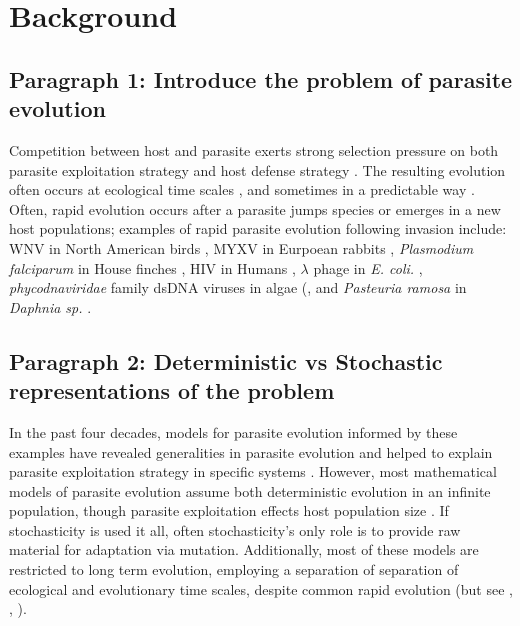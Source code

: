 
\section*{Background}

\subsection*{Paragraph 1: Introduce the problem of parasite evolution}

Competition between host and parasite exerts strong selection pressure on both parasite exploitation strategy and host defense strategy \citep{SchneiderandAyres2008, AyresandSchneider2012, KutzerandArmitage2016}. The resulting evolution often occurs at ecological time scales \citep{DayandProulx2004, Bolkeretal.2010, Lion2018}, and sometimes in a predictable way \citep{Ebert1998, Pugliese2002, Laineetal.2008, Frickeletal.2016}. Often, rapid evolution occurs after a parasite jumps species or emerges in a new host populations; examples of rapid parasite evolution following invasion include: WNV in North American birds \cite{Beasleyetal.2003}, MYXV in Eurpoean rabbits \citep{FennerandMarshall1957}, \emph{Plasmodium falciparum} in House finches \cite{Flemingetal.2018}, HIV in Humans \cite{Fraseretal.2007}, $\lambda$ phage in \emph{E. coli.} \cite{Berngruberetal.2015}, \emph{phycodnaviridae} family dsDNA viruses in algae (\citep{Frickeletal.2016, Frickeletal.2018}, and \emph{Pasteuria ramosa} in \emph{Daphnia sp.} \citep{Duffyetal.2009}. 

\subsection*{Paragraph 2: Deterministic vs Stochastic representations of the problem}

In the past four decades, models for parasite evolution informed by these examples have revealed generalities in parasite evolution and helped to explain parasite exploitation strategy in specific systems \citep[for a review see][]{Cressleretal.2016}. However, most mathematical models of parasite evolution assume both deterministic evolution in an infinite population, though parasite exploitation effects host population size \citep{Frickeletal.2016, Papkouetal.2016, Frickeletal.2018}. If stochasticity is used it all, often stochasticity's only role is to provide raw material for adaptation via mutation. Additionally, most of these models are restricted to long term evolution, employing a separation of separation of ecological and evolutionary time scales, despite common rapid evolution (but see \citealt{Bolkeretal.2010}, \citealt{Lion2018}, \citealt{Parsonsetal.2018}). 

